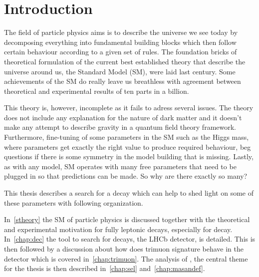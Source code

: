 \chapter{Introduction}



The field of particle physics aims is to describe the universe we see today by decomposing everything into fundamental building blocks which then follow certain behaviour according to a given set of rules. The foundation bricks of theoretical formulation of the current best established theory that describe the universe around us, the Standard Model (\Gls{SM}), were laid last century. Some achievements of the \gls{SM} do really leave us breathless with agreement between theoretical and experimental results of ten parts in a billion. 

This theory is, however, incomplete as it fails to adress several issues. The theory does not include any explanation for the nature of dark matter and it doesn't make any attempt to describe gravity in a quantum field theory framework. Furthermore, fine-tuning of some parameters in the \gls{SM} such as the Higgs mass, where parameters get exactly the right value to produce required behaviour, beg questions if there is some symmetry in the model building that is missing. Lastly, as with any model, SM operates with many free parameters that need to be plugged in so that predictions can be made. So why are there exactly so many?

This thesis describes a search for a decay which can help to shed light on some of these parameters with following organization.

In~\autoref{stheory} the \gls{SM} of particle physics is discussed together with the theoretical and experimental motivation for fully leptonic decays, especially for \Bmumumu decay. In~\autoref{chap:dec} the tool to search for \Bmumumu decays, the LHCb detector, is detailed. This is then followed by a discussion about how does trimuon signature behave in the detector which is covered in~\autoref{chap:trimuon}. The analysis of \Bmumumu, the central theme for the thesis is then described in~\autoref{chap:sel} and~\autoref{chap:masandef}.  

